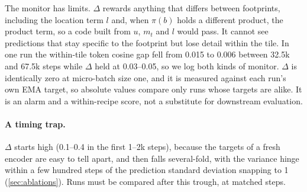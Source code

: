The monitor has limits. $\Delta$ rewards anything that differs between footprints, including the location term $l$ and, when $\pi(b)$ holds a different product, the product term, so a code built from $u$, $m_t$ and $l$ would pass. It cannot see predictions that stay specific to the footprint but lose detail within the tile. In one run the within-tile token cosine gap fell from 0.015 to 0.006 between 32.5k and 67.5k steps while $\Delta$ held at 0.03--0.05, so we log both kinds of monitor. $\Delta$ is identically zero at micro-batch size one, and it is measured against each run's own EMA target, so absolute values compare only runs whose targets are alike. It is an alarm and a within-recipe score, not a substitute for downstream evaluation.

\paragraph{A timing trap.} $\Delta$ starts high (0.1--0.4 in the first 1--2k steps), because the targets of a fresh encoder are easy to tell apart, and then falls several-fold, with the variance hinge within a few hundred steps of the prediction standard deviation snapping to 1 (\cref{sec:ablations}). Runs must be compared after this trough, at matched steps.
